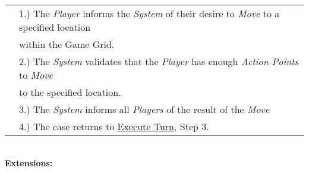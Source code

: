 \documentclass{article}
\begin{document}
	\begin{tabular}{l l}
		&1.) The \textit{Player} informs the \textit{System} of their desire to \textit{Move} to a specified location\\
		&\qquad within the Game Grid.\\
		&2.) The \textit{System} validates that the \textit{Player} has enough \textit{Action Points} to \textit{Move}\\
		&\qquad to the specified location.\\
		&3.) The \textit{System} informs all \textit{Players} of the result of the \textit{Move} \\
		&4.) The case returns to \underline{Execute Turn}, Step 3.\\
	\end{tabular}\\
	\textbf{Extensions: }\\
\end{document}
